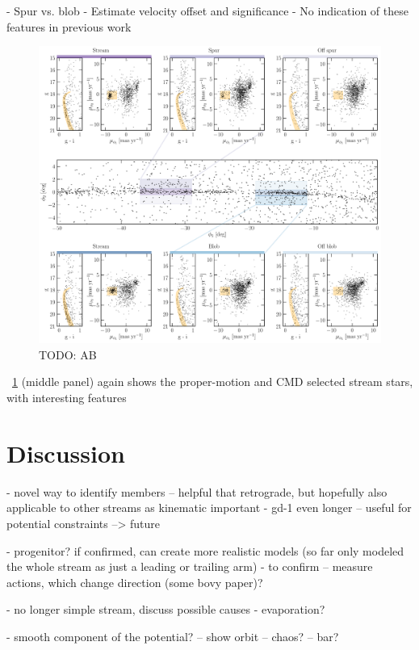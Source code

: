 \documentclass[modern]{aastex62}
\newcommand{\todo}[1]{{\color{red} TODO: #1}}
\begin{document}
- Spur vs. blob
- Estimate velocity offset and significance
- No indication of these features in previous work

\begin{figure}[h]
\begin{center}
\includegraphics[width=\textwidth]{features.pdf}
\end{center}
\caption{%
\todo{AB}
\label{fig:features}
}
\end{figure}

\figurename~\ref{fig:features} (middle panel) again shows the proper-motion and CMD selected stream stars, with interesting features

\section{Discussion}
\label{sec:discussion}

- novel way to identify members -- helpful that retrograde, but hopefully also applicable to other streams as kinematic important
- gd-1 even longer -- useful for potential constraints --> future

- progenitor? if confirmed, can create more realistic models (so far only modeled the whole stream as just a leading or trailing arm)
- to confirm -- measure actions, which change direction (some bovy paper)?

- no longer simple stream, discuss possible causes
- evaporation?

- smooth component of the potential?
-- show orbit
-- chaos?
-- bar?
\end{document}
